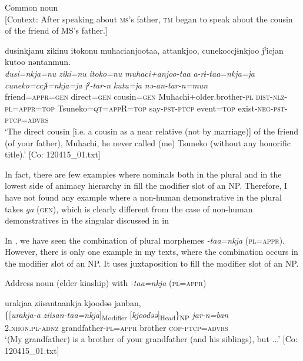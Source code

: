 \ex Common noun\\{}
[Context: After speaking about \textsc{ms}’s father, \textsc{tm} began to speak about the cousin of the friend of MS’s father.]

{\TM}
\glll dusinkjanu  zikinu  {\textbar}itoko{\textbar}nu  muhacianjootaa,     attankjoo,  cunekoccjɨnkjoo  jˀicjan   kutoo  nəntanmun.\\
      \textit{dusi=nkja=nu}  \textit{ziki=nu}  \textit{itoko=nu}  \textit{muhaci+anjoo-taa}   \textit{a-rɨ-taa=nkja=ja}  \textit{cuneko=ccjɨ=nkja=ja}  \textit{jˀ-tar-n}   \textit{kutu=ja}  \textit{nə-an-tar-n=mun}\\
      friend=\textsc{appr}=\textsc{gen}  direct=\textsc{gen}  cousin=\textsc{gen}  Muhachi+older.brother-\textsc{pl} \textsc{dist}-\textsc{nlz}-\textsc{pl}=\textsc{appr}=\textsc{top}  Tsuneko=\textsc{qt}=\textsc{app}R=\textsc{top}  say-\textsc{pst}-\textsc{ptcp}      event=\textsc{top}  exist-\textsc{neg}-\textsc{pst}-\textsc{ptcp}=\textsc{advrs}\\
\glt ‘The direct cousin [i.e. a cousin as a near relative (not by marriage)] of the friend (of your father), Muhachi, he never called (me) Tsuneko (without any honorific title).’ [Co: 120415\_01.txt]
\z

In fact, there are few examples where nominals both in the plural and in the lowest side of animacy hierarchy in  fill the modifier slot of an NP. Therefore, I have not found any example where a non-human demonstrative in the plural takes \textit{ga} (\textsc{gen}), which is clearly different from the case of non-human demonstratives in the singular discussed in  in 

In , we have seen the combination of plural morphemes \textit{-taa=nkja} (\textsc{pl}=\textsc{appr}). However, there is only one example in my texts, where the combination occurs in the modifier slot of an NP. It uses juxtaposition to fill the modifier slot of an NP.

\ea\label{ex:6-114}
  Address noun (elder kinship) with \textit{-taa=nkja} (\textsc{pl}=\textsc{appr})

{\TM}
\glll urakjaa  ziisantaankja  kjoodəə  janban,\\
    \{[\textit{urakja-a}  \textit{ziisan-taa=nkja}]\textsubscript{Modifier}  [\textit{kjoodəə}]\textsubscript{Head}\}\textsubscript{NP}  \textit{jar-n=ban}\\
    2.\textsc{nhon}.\textsc{pl}-\textsc{adnz}  grandfather-\textsc{pl}=\textsc{appr}  brother  \textsc{cop}-\textsc{ptcp}=\textsc{advrs}\\
\glt    ‘(My grandfather) is a brother of your grandfather (and his siblings), but ...’ [Co: 120415\_01.txt]
\z


